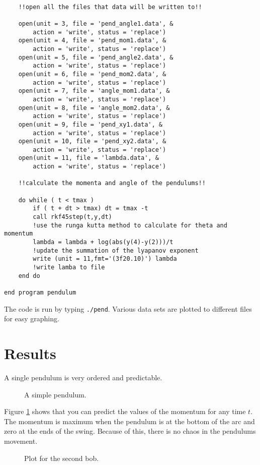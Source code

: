 \documentclass[12pt]{article}
\begin{document}
\begin{lstlisting}[frame=single,caption={{\tt adpend.f95}},label=adpend]
	
	!!open all the files that data will be written to!!

	open(unit = 3, file = 'pend_angle1.data', &
	    action = 'write', status = 'replace')
	open(unit = 4, file = 'pend_mom1.data', &
	    action = 'write', status = 'replace')
	open(unit = 5, file = 'pend_angle2.data', &
	    action = 'write', status = 'replace')
	open(unit = 6, file = 'pend_mom2.data', &
	    action = 'write', status = 'replace')
	open(unit = 7, file = 'angle_mom1.data', &
	    action = 'write', status = 'replace')
	open(unit = 8, file = 'angle_mom2.data', &
	    action = 'write', status = 'replace')
	open(unit = 9, file = 'pend_xy1.data', &
	    action = 'write', status = 'replace')
	open(unit = 10, file = 'pend_xy2.data', &
	    action = 'write', status = 'replace')
	open(unit = 11, file = 'lambda.data', &
	    action = 'write', status = 'replace')

	!!calculate the momenta and angle of the pendulums!!

	do while ( t < tmax )
		if ( t + dt > tmax) dt = tmax -t
		call rkf45step(t,y,dt)						
		!use the runga kutta method to calculate for theta and momentum
		lambda = lambda + log(abs(y(4)-y(2)))/t 	
		!update the summation of the lyapanov exponent
		write (unit = 11,fmt='(3f20.10)') lambda 	
		!write lamba to file
	end do

end program pendulum

\end{lstlisting}


The code is run by typing {\tt ./pend}. Various data sets are plotted to different files for easy graphing.
\section{Results}

A single pendulum is very ordered and predictable.  

\begin {figure}[!htb]
	\resizebox{\columnwidth}{!}{}
	\caption{A simple pendulum. }
	\label{singlependulum}
\end {figure}

Figure \ref{singlependulum} shows that you can predict the values of the momentum for any time $t$. The momentum is maximum when the pendulum is at the bottom of the arc and zero at the ends of the swing. Because of this, there is no chaos in the pendulums movement.

\begin {figure}[!htb]
	\resizebox{\columnwidth}{!}{}
	\caption{Plot for the second bob. }
	\label{dobulepend1}
\end {figure}
\end{document}
